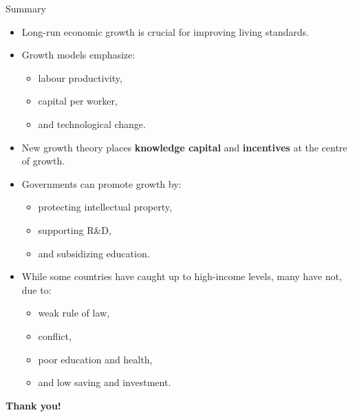 \documentclass[aspectratio=169]{beamer}
\begin{document}
\begin{frame}{Summary}
\transfade
\begin{itemize}[<+->]
  \item Long-run economic growth is crucial for improving living standards.
  \item Growth models emphasize:
  \begin{itemize}[<+->]
    \item labour productivity,
    \item capital per worker,
    \item and technological change.
  \end{itemize}
  \item New growth theory places \textbf{knowledge capital} and \textbf{incentives} at the centre of growth.
  \item Governments can promote growth by:
  \begin{itemize}[<+->]
    \item protecting intellectual property,
    \item supporting R\&D,
    \item and subsidizing education.
  \end{itemize}
  \item While some countries have caught up to high-income levels, many have not, due to:
  \begin{itemize}[<+->]
    \item weak rule of law,
    \item conflict,
    \item poor education and health,
    \item and low saving and investment.
  \end{itemize}
\end{itemize}
\end{frame}

\begin{frame}
\centering
\Huge \textbf{Thank you!}
\end{frame}
\end{document}
